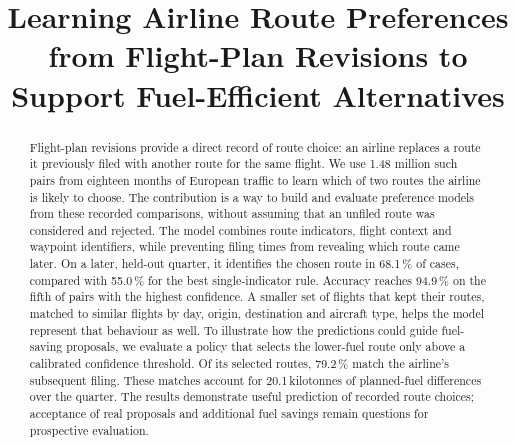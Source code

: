 \documentclass[a4paper,conference]{IEEEtran}
\begin{document}
\title{Learning Airline Route Preferences from Flight-Plan Revisions to Support Fuel-Efficient Alternatives}

\newif\ifblind
\blindfalse

\ifblind
  \author{\IEEEauthorblockN{Anonymous submission}
  \IEEEauthorblockA{Author details withheld}}
\else
  \author{%
  }
\fi

\maketitle
\pagestyle{plain}

\begin{abstract}
Flight-plan revisions provide a direct record of route choice: an airline
replaces a route it previously filed with another route for the same
flight. We use 1.48 million such pairs from eighteen months of European
traffic to learn which of two routes the airline is likely to choose.
The contribution is a way to build and evaluate preference models from
these recorded comparisons, without assuming that an unfiled route was
considered and rejected. The model combines route indicators, flight
context and waypoint identifiers, while preventing filing times from
revealing which route came later. On a later, held-out quarter, it
identifies the chosen route in 68.1\,\% of cases, compared with
55.0\,\% for the best single-indicator rule. Accuracy reaches
94.9\,\% on the fifth of pairs with the highest confidence. A smaller
set of flights that kept their routes, matched to similar flights by
day, origin, destination and aircraft type, helps the model represent
that behaviour as well. To illustrate how the predictions could guide
fuel-saving proposals, we evaluate a policy that selects the lower-fuel
route only above a calibrated confidence threshold. Of its selected
routes, 79.2\,\% match the airline's subsequent filing. These matches
account for 20.1\,kilotonnes of planned-fuel differences over the quarter.
The results demonstrate useful prediction of recorded route choices;
acceptance of real proposals and additional fuel savings remain questions
for prospective evaluation.

\end{abstract}
\end{document}
